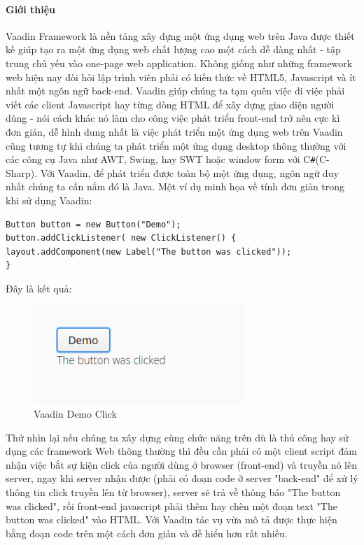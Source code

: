 \paragraph{Giới thiệu} Vaadin Framework là nền tảng xây dựng một ứng dụng web trên Java được thiết kế giúp tạo ra một ứng dụng web chất lượng cao một cách dễ dàng nhất - tập trung chủ yếu vào one-page web application. Không giống như những framework web hiện nay đòi hỏi lập trình viên phải có kiến thức về HTML5, Javascript và ít nhất một ngôn ngữ back-end. Vaadin giúp chúng ta tạm quên việc đi việc phải viết các client Javascript hay từng dòng HTML để xây dựng giao diện người dùng - nói cách khác nó làm cho công việc phát triển front-end trở nên cực kì đơn giản, dễ hình dung nhất là việc phát triển một ứng dụng web trên Vaadin cũng tương tự khi chúng ta phát triển một ứng dụng desktop thông thường với các công cụ Java như AWT, Swing, hay SWT hoặc window form với C\verb|#|(C-Sharp).  Với Vaadin, để phát triển được toàn bộ một ứng dụng, ngôn ngữ duy nhất chúng ta cần nắm đó là Java. Một ví dụ minh họa về tính đơn giản trong khi sử dụng Vaadin:
\begin{verbatim}
Button button = new Button("Demo");
button.addClickListener( new ClickListener() {
layout.addComponent(new Label("The button was clicked"));
}
\end{verbatim}
Đây là kết quả:
\begin{figure}[H]
	\centering
	\includegraphics[width=80mm]{Figures/vaadin_democlick.png}
	\caption{Vaadin Demo Click\label{overflow}}
\end{figure}
Thử nhìn lại nếu chúng ta xây dựng cùng chức năng trên dù là thủ công hay sử dụng các framework Web thông thường thì đều cần phải có một client script đảm nhận việc bắt sự kiện click của người dùng ở browser (front-end) và truyền nó lên server, ngay khi server nhận được (phải có đoạn code ở server "back-end" để xử lý thông tin click truyền lên từ browser), server sẽ trả về thông báo "The button was clicked", rồi front-end javascript phải thêm hay chèn một đoạn text "The button was clicked" vào HTML. Với Vaadin tác vụ vừa mô tả được thực hiện bằng đoạn code trên một cách đơn giản và dễ hiểu hơn rất nhiều.
